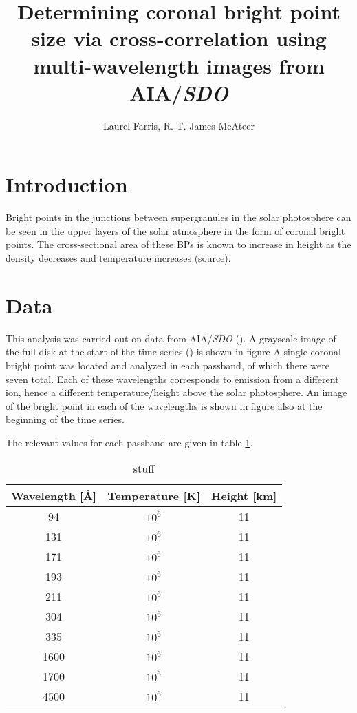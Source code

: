 \documentclass[preprint2]{aastex}
\begin{document}
\title{Determining coronal bright point size via cross-correlation using
multi-wavelength images from AIA/\textit{SDO}}
\author{Laurel Farris, R. T. James McAteer}

\begin{abstract}
\end{abstract}

\section{Introduction}\label{intro}
Bright points in the junctions between supergranules in the solar photosphere
can be seen in the upper layers of the solar atmosphere in the form of coronal
bright points. The cross-sectional area of these BPs is known to increase in
height as the density decreases and temperature increases (source).


\section{Data}\label{data}
This analysis was carried out on data from AIA/\textit{SDO} (\cite{Lemen}).
A grayscale image of the full disk at the start of the time series () is shown
in figure %
A single coronal bright point was located and analyzed in each passband, of
which there were seven total. Each of these wavelengths corresponds to emission
from a different ion, hence a different temperature/height above the solar
photosphere.
An image of the bright point in each of the wavelengths is shown in figure
also at the beginning of the time series.

The relevant values for each passband are given in table \ref{aia}.
\begin{table}[h]
\centering
    \begin{tabular}{c c c}
        \hline\hline
        Wavelength [\AA{}] & Temperature [K] & Height [km]\\ 
        \hline
        94 & $10^{6}$ & 11\\
        131 & $10^{6}$ & 11\\
        171 & $10^{6}$ & 11\\
        193 & $10^{6}$ & 11\\
        211 & $10^{6}$ & 11\\
        304 & $10^{6}$ & 11\\
        335 & $10^{6}$ & 11\\
        1600 & $10^{6}$ & 11\\
        1700 & $10^{6}$ & 11\\
        4500 & $10^{6}$ & 11\\
    \end{tabular}
\caption{stuff}
\label{aia}
\end{table}
\end{document}
